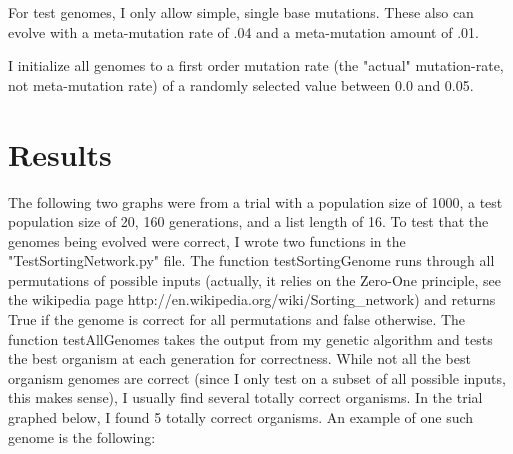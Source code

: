 \documentclass[9pt]{article}
\begin{document}
For test genomes, I only allow simple, single base mutations. These also can evolve with a meta-mutation rate of .04 and a meta-mutation amount of .01. 

I initialize all genomes to a first order mutation rate (the "actual" mutation-rate, not meta-mutation rate) of a randomly selected value between 0.0 and 0.05. 

\vspace{5mm}


\section{Results}  
  
The following two graphs were from a trial with a population size of 1000, a test population size of 20, 160 generations, and a list length of 16. To test that the genomes being evolved were correct, I wrote two functions in the "TestSortingNetwork.py" file. The function testSortingGenome runs through all permutations of possible inputs (actually, it relies on the Zero-One principle, see the wikipedia page http://en.wikipedia.org/wiki/Sorting\_network) and returns True if the genome is correct for all permutations and false otherwise. The function testAllGenomes takes the output from my genetic algorithm and tests the best organism at each generation for correctness. While not all the best organism genomes are correct (since I only test on a subset of all possible inputs, this makes sense), I usually find several totally correct organisms. In the trial graphed below, I found 5 totally correct organisms. An example of one such genome is the following: 
\end{document}
